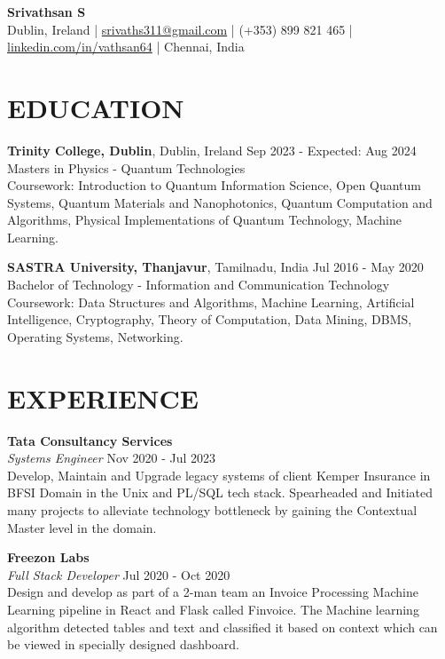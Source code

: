 \documentclass[a4paper,9pt]{extarticle}
\begin{document}
\pagestyle{empty}

\begin{center}
    \textbf{\Large Srivathsan S}\\[2pt]
    Dublin, Ireland | \href{mailto:srivaths311@gmail.com}{srivaths311@gmail.com} | (+353) 899 821 465 | \href{https://www.linkedin.com/in/vathsan64}{linkedin.com/in/vathsan64} | Chennai,
    India 
\end{center}

\section*{EDUCATION}
\noindent
\textbf{Trinity College, Dublin}, Dublin, Ireland \hfill Sep 2023 - Expected: Aug 2024\\[1pt] 
Masters in Physics - Quantum Technologies\\[1pt]
Coursework: Introduction to Quantum Information Science, Open Quantum Systems, Quantum Materials and Nanophotonics, Quantum Computation and
Algorithms, Physical Implementations of Quantum Technology, Machine Learning.

\noindent
\textbf{SASTRA University, Thanjavur}, Tamilnadu, India \hfill Jul 2016 - May 2020\\[1pt] 
Bachelor of Technology - Information and Communication Technology\\[1pt]
Coursework: Data Structures and Algorithms, Machine Learning, Artificial Intelligence, Cryptography, Theory of Computation, Data Mining,
DBMS, Operating Systems, Networking.

\section*{EXPERIENCE}
\noindent
\textbf{Tata Consultancy Services}\\[1pt]
\textit{Systems Engineer} \hfill Nov 2020 - Jul 2023\\[1pt]
Develop, Maintain and Upgrade legacy systems of client Kemper Insurance in BFSI Domain in the Unix and PL/SQL tech stack.
Spearheaded and Initiated many projects to alleviate technology bottleneck by gaining the Contextual Master level in the
domain.

\noindent
\textbf{Freezon Labs}\\[1pt]
\textit{Full Stack Developer} \hfill Jul 2020 - Oct 2020\\[1pt]
Design and develop as part of a 2-man team an Invoice Processing Machine Learning pipeline in React and Flask called Finvoice.
The Machine learning algorithm detected tables and text and classified it based on context which can be viewed in specially designed dashboard.
\end{document}
